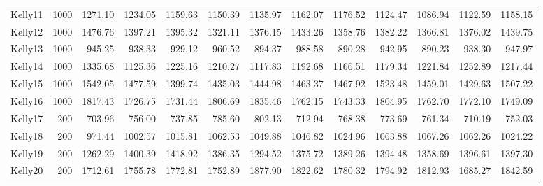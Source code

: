 \documentclass[11pt]{article} %
\begin{document}
\begin{enumerate}
{\begin{tabular}{lrrrrrrrrrrrr}
  Kelly11 &      1000 &        1271.10 &       1234.05 &       1159.63 &       1150.39 &       1135.97 &       1162.07 &       1176.52 &       1124.47 &       1086.94 &       1122.59 &        1158.15 \\
  Kelly12 &      1000 &        1476.76 &       1397.21 &       1395.32 &       1321.11 &       1376.15 &       1433.26 &       1358.76 &       1382.22 &       1366.81 &       1376.02 &        1439.75 \\
  Kelly13 &      1000 &         945.25 &        938.33 &        929.12 &        960.52 &        894.37 &        988.58 &        890.28 &        942.95 &        890.23 &        938.30 &         947.97 \\
  Kelly14 &      1000 &        1335.68 &       1125.36 &       1225.16 &       1210.27 &       1117.83 &       1192.68 &       1166.51 &       1179.34 &       1221.84 &       1252.89 &        1217.44 \\
  Kelly15 &      1000 &        1542.05 &       1477.59 &       1399.74 &       1435.03 &       1444.98 &       1463.37 &       1467.92 &       1523.48 &       1459.01 &       1429.63 &        1507.22 \\
  Kelly16 &      1000 &        1817.43 &       1726.75 &       1731.44 &       1806.69 &       1835.46 &       1762.15 &       1743.33 &       1804.95 &       1762.70 &       1772.10 &        1749.09 \\
  Kelly17 &       200 &         703.96 &        756.00 &        737.85 &        785.60 &        802.13 &        712.94 &        768.38 &        773.69 &        761.34 &        710.19 &         752.03 \\
  Kelly18 &       200 &         971.44 &       1002.57 &       1015.81 &       1062.53 &       1049.88 &       1046.82 &       1024.96 &       1063.88 &       1067.26 &       1062.26 &        1024.22 \\
  Kelly19 &       200 &        1262.29 &       1400.39 &       1418.92 &       1386.35 &       1294.52 &       1375.72 &       1389.26 &       1394.48 &       1358.69 &       1396.61 &        1397.30 \\
  Kelly20 &       200 &        1712.61 &       1755.78 &       1772.81 &       1752.89 &       1877.90 &       1822.62 &       1780.32 &       1794.92 &       1812.93 &       1685.27 &        1842.59 \\
\bottomrule
\end{tabular}}\\[0.2cm]


\end{enumerate}
\end{document}

